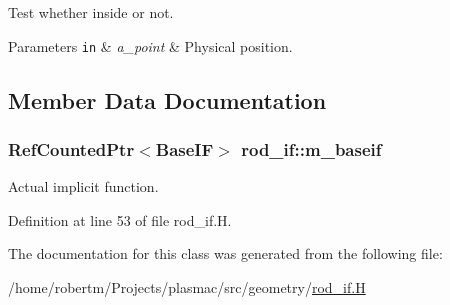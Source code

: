 Test whether inside or not. 


\begin{DoxyParams}[1]{Parameters}
\mbox{\tt in}  & {\em a\+\_\+point} & Physical position. \\
\hline
\end{DoxyParams}


\subsection{Member Data Documentation}
\subsubsection[{\texorpdfstring{m\+\_\+baseif}{m_baseif}}]{\setlength{\rightskip}{0pt plus 5cm}Ref\+Counted\+Ptr$<$Base\+IF$>$ rod\+\_\+if\+::m\+\_\+baseif\hspace{0.3cm}{\ttfamily [protected]}}\hypertarget{classrod__if_afb29c7f7ac38e19390caffd145df14ad}{}\label{classrod__if_afb29c7f7ac38e19390caffd145df14ad}


Actual implicit function. 



Definition at line 53 of file rod\+\_\+if.\+H.



The documentation for this class was generated from the following file\+:\begin{DoxyCompactItemize}
\item 
/home/robertm/\+Projects/plasmac/src/geometry/\hyperlink{rod__if_8H}{rod\+\_\+if.\+H}\end{DoxyCompactItemize}

